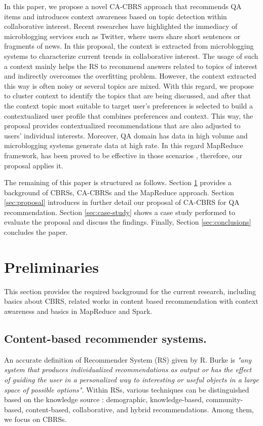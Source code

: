 \documentclass[preprint]{elsarticle}
\begin{document}
\begin{spacing}{1.5}
In this paper, we propose a novel CA-CBRS approach that recommends QA items and introduces context awareness based on topic detection within collaborative interest. Recent researches \cite{Hermida2010} have highlighted the immediacy of microblogging services such as Twitter, where users share short sentences or fragments of news. In this proposal, the context is extracted from microblogging systems to characterize current trends in collaborative interest. The usage of such a context mainly helps the RS to recommend answers related to topics of interest and indirectly overcomes the overfitting problem. However, the context extracted this way is often noisy or several topics are mixed. With this regard, we propose to cluster context to identify the topics that are being discussed, and after that the context topic most suitable to target user's preferences is selected to build a contextualized user profile that combines preferences and context. This way, the proposal provides contextualized recommendations that are also adjusted to users' individual interests. Moreover, QA domain has data in high volume and microblogging systems generate data at high rate. In this regard MapReduce framework, has been proved to be effective in those scenarios \cite{Maillo2017,Nair2015}, therefore, our proposal applies it.

The remaining of this paper is structured as follows. Section \ref{sec:preliminaries} provides a background of CBRSs, CA-CBRSs and the MapReduce approach. Section \ref{sec:proposal} introduces in further detail our proposal of CA-CBRS for QA recommendation. Section \ref{sec:case-study} shows a case study performed to evaluate the proposal and discuss the findings. Finally, Section \ref{sec:conclusions} concludes the paper.

\section{Preliminaries}
\label{sec:preliminaries}

This section provides the required background for the current research, including basics about CBRS, related works in content based recommendation with context awareness and basics in MapReduce and Spark.

\subsection{Content-based recommender systems.}

An accurate definition of Recommender System (RS) given by R. Burke \cite{Burke2002} is \emph{"any system that produces individualized recommendations as output or has the effect of guiding the user in a personalized way to interesting or useful objects in a large space of possible options"}. Within RSs, various techniques can be distinguished based on the knowledge source \cite{DePessemier2016}: demographic, knowledge-based, community-based, content-based, collaborative, and hybrid recommendations. Among them, we focus on CBRSs.


\end{spacing}
\end{document}
